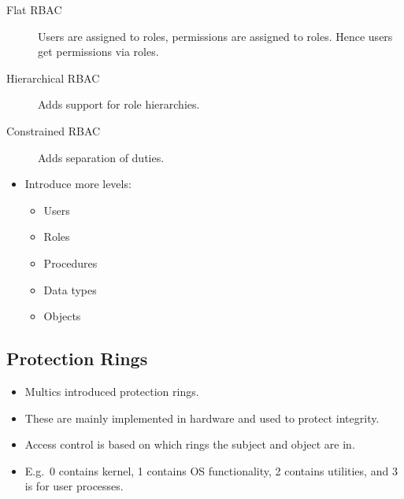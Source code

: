 \documentclass{beamer}
\begin{document}
\begin{frame}{\insertsubsectionhead}
  \begin{description}
    \item[Flat RBAC] Users are assigned to roles, permissions are assigned to 
      roles.
      Hence users get permissions via roles.

    \item[Hierarchical RBAC]
      Adds support for role hierarchies.

    \item[Constrained RBAC]
      Adds separation of duties.

  \end{description}
\end{frame}

\begin{frame}{\insertsubsectionhead}
  \begin{itemize}
    \item Introduce more levels:
      \begin{itemize}
        \item Users
        \item Roles
        \item Procedures
        \item Data types
        \item Objects
      \end{itemize}
  \end{itemize}
\end{frame}

\subsection{Protection Rings}

\begin{frame}{\insertsubsectionhead}
  \begin{itemize}
    \item Multics introduced protection rings.

    \item These are mainly implemented in hardware and used to protect 
      integrity.

    \item Access control is based on which rings the subject and object are in.

    \item E.g.\ 0 contains kernel, 1 contains OS functionality, 2 contains 
      utilities, and 3 is for user processes.

  \end{itemize}
\end{frame}
\end{document}
